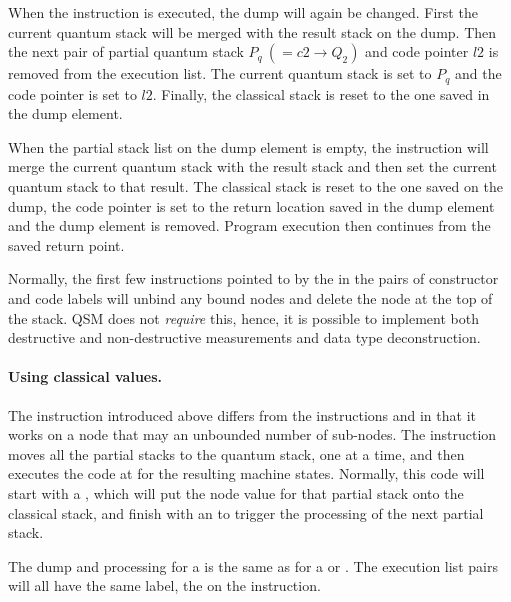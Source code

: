 When the  instruction is executed, the dump will
again be changed. First the current quantum stack will be merged with
the result stack on the dump. Then the next pair of 
partial quantum stack $P_q\ (=c2\rightarrow Q_2) $ 
and code pointer $l2$ is removed from the execution list. 
The  current quantum stack is set to $P_q$ and the code pointer 
is set to $l2$. Finally, the classical stack is reset to the one 
saved in the dump element.

When the partial stack  list on the dump element is empty, 
the  instruction
will merge the current quantum stack with the result stack and then
set the current quantum stack to that result. 
The classical stack is reset to the one
saved on the dump, the code pointer is set to the return location
 saved in the
dump element and the dump element is removed. Program execution then
continues from the saved return point.

Normally, the first few instructions pointed to by the  in 
the pairs of constructor and code labels will unbind any bound nodes and 
delete the node at the top of the stack. 
QSM does not \emph{require} this, hence, it is possible to implement both
destructive and non-destructive measurements and data type deconstruction.

\paragraph{Using classical values.} The  instruction introduced
above differs from the instructions
  and  in that it works
on a node that may an unbounded number of sub-nodes.
The  instruction moves 
all the partial stacks to the quantum stack, one at a time, and then
executes the code at 
 for the resulting machine states. Normally, this 
code will start with a , which will put the node
value for that partial stack onto the
classical stack, and finish with an   to
 trigger the processing of the next partial stack.

The dump and  processing for a 
 is the same
as for a  or . The execution list pairs
will all have the same label, the  on the instruction.

